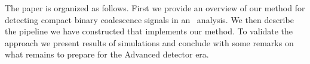 The paper is organized as follows. First we provide an overview of our method
for detecting compact binary coalescence signals in an \earlywarning\ analysis.
We then describe the pipeline we have constructed that implements our method.
To validate the approach we present results of simulations and conclude with
some remarks on what remains to prepare for the Advanced detector era.

